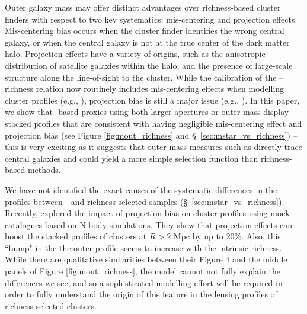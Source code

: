 \documentclass[fleqn,usenatbib,useAMS]{mnras}
\begin{document}
    Outer galaxy mass may offer distinct advantages over richness-based cluster finders with respect
    to two key systematics: mis-centering and projection effects.  
    Mis-centering bias occurs when the cluster finder identifies the wrong central galaxy, or when
    the central galaxy is not at the true center of the dark matter halo. 
    Projection effects have a variety of origins, such as the anisotropic distribution of satellite
    galaxies within the halo, and the presence of large-scale structure along the line-of-sight to
    the cluster. 
    While the calibration of the \mvir{}--richness relation now routinely includes mis-centering
    effects when modelling cluster \dsigma{} profiles (e.g., \citealt{Murata2018, Murata2019,
    McClintock2019}), projection bias is still a major issue (e.g., \citealt{Costanzi2019,
    Sunayama2020, DES2020, To2021b}). 
    In this paper, we show that \mstar{}-based proxies using both larger apertures or outer mass
    display stacked \dsigma{} profiles that are consistent with having negligible mis-centering
    effect and projection bias (see Figure \ref{fig:mout_richness} and \S\
    \ref{sec:mstar_vs_richness}) -- this is very exciting as it suggests that outer mass measures
    such as \menve{50}{100} directly trace central galaxies and could yield a more simple selection
    function than richness-based methods.  
    
    We have not identified the exact causes of the systematic differences in the \dsigma{} profiles
    between \mstar{}- and richness-selected samples (\S\ \ref{sec:mstar_vs_richness}).
    Recently, \citet{Sunayama2020} explored the impact of projection bias on cluster \dsigma{}
    profiles using mock catalogues based on N-body simulations.
    They show that projection effects can boost the stacked \dsigma{} profiles of clusters at $R >
    2$ Mpc by up to 20\%.
    Also, this ``bump" in the the outer \dsigma{} profile seems to increase with the intrinsic
    richness.
    While there are qualitative similarities between their Figure 4 and the middle panels of Figure
    \ref{fig:mout_richness}, the \citet{Sunayama2020} model cannot not fully explain the differences
    we see, and so a sophisticated modelling effort will be required in order to fully understand the
    origin of this feature in the lensing profiles of richness-selected clusters.
    
\end{document}
